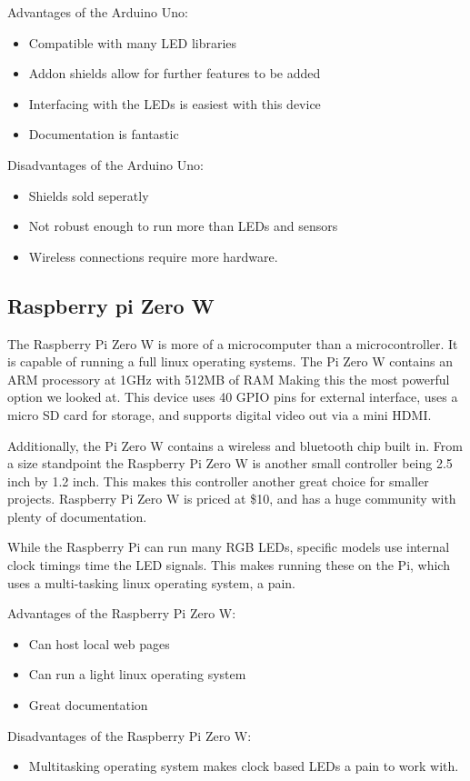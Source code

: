 \documentclass[onecolumn, draftclsnofoot,10pt, compsoc]{IEEEtran}
\begin{document}
		\vspace{5mm}
		Advantages of the Arduino Uno:
		\begin{itemize}
			\item Compatible with many LED libraries
			\item Addon shields allow for further features to be added
			\item Interfacing with the LEDs is easiest with this device
			\item Documentation is fantastic
		\end{itemize}
		Disadvantages of the Arduino Uno:
		\begin{itemize}
			\item Shields sold seperatly
			\item Not robust enough to run more than LEDs and sensors
			\item Wireless connections require more hardware.
		\end{itemize}
		\subsection{Raspberry pi Zero W}

		\vspace{5mm}
		\noindent The Raspberry Pi Zero W is more of a microcomputer than a microcontroller.
		It is capable of running a full linux operating systems. The Pi Zero W
		contains an ARM processory at 1GHz with 512MB of RAM Making this the most
		powerful option we looked at. This device uses 40 GPIO pins for
		external interface, uses a micro SD card for storage, and supports digital
		video out via a mini HDMI\cite[Pg 7]{pizero}.

		\vspace{5mm}
		\noindent Additionally, the Pi Zero W contains a wireless and bluetooth chip built in.
		From a size standpoint the Raspberry Pi Zero W is another small controller
		being 2.5 inch by 1.2 inch. This makes this controller another great choice
		for smaller projects. Raspberry Pi Zero W is priced at \$10, and has a huge
		community with plenty of documentation.

		\vspace{5mm}
		\noindent While the Raspberry Pi can run many RGB LEDs, specific models use internal
		clock timings time the LED signals. This makes running these on the Pi,
		which uses a multi-tasking linux operating system, a pain.

		\vspace{5mm}
		\noindent Advantages of the Raspberry Pi Zero W:
		\begin{itemize}
			\item Can host local web pages
			\item Can run a light linux operating system
			\item Great documentation
		\end{itemize}
		Disadvantages of the Raspberry Pi Zero W:
		\begin{itemize}
			\item Multitasking operating system makes clock based LEDs a pain to
			work with.
		\end{itemize}
\end{document}
